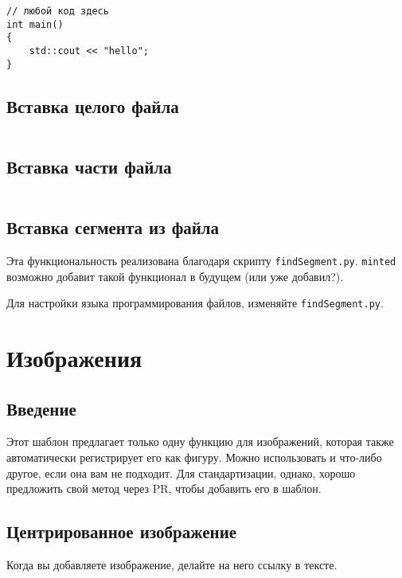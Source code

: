 \documentclass[a4paper,12pt]{report}
\begin{document}
\begin{verbatim}
// любой код здесь
int main()
{
    std::cout << "hello";
}
\end{verbatim}

\subsection{Вставка целого файла}

\inputminted[]{zig}{../src/sourcefile.zig}

\subsection{Вставка части файла}

\inputminted[firstline=2,lastline=5]{zig}{../src/sourcefile.zig}

\subsection{Вставка сегмента из файла}

Эта функциональность реализована благодаря скрипту \texttt{findSegment.py}.
\texttt{minted} возможно добавит такой функционал в будущем (или уже добавил?).

Для настройки языка программирования файлов, изменяйте \texttt{findSegment.py}.


\section{Изображения}

\subsection{Введение}

Этот шаблон предлагает только одну функцию для изображений, 
которая также автоматически регистрирует его как фигуру.
Можно использовать и что-либо другое, если она вам не подходит.
Для стандартизации, однако, хорошо предложить свой метод через \ac{PR}, чтобы добавить его в шаблон.

\subsection{Центрированное изображение}

Когда вы добавляете изображение, делайте на него ссылку в тексте.
\end{document}

